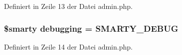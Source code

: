 Definiert in Zeile 13 der Datei admin.php.
\subsubsection{\setlength{\rightskip}{0pt plus 5cm}\$smarty {\bf debugging} = {\bf SMARTY\_\-DEBUG}}\label{admin_8php_ea9d5e8f56bbeab9291d94598d0eddb3}




Definiert in Zeile 14 der Datei admin.php.